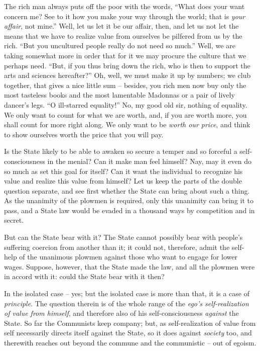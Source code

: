 The rich man always puts off the poor with the words, ``What does your want 
concern me? See to it how you make your way through the world; that is 
\textit{your affair}, not mine.'' Well, let us let it be our affair, then, 
and let us not let the means that we have to realize value from ourselves be 
pilfered from us by the rich. ``But you uncultured people really do not need 
so much.'' Well, we are taking somewhat more in order that for it we may 
procure the culture that we perhaps need. ``But, if you thus bring down the 
rich, who is then to support the arts and sciences hereafter?'' Oh, well, we 
must make it up by numbers; we club together, that gives a nice little sum -- 
besides, you rich men now buy only the most tasteless books and the most 
lamentable Madonnas or a pair of lively dancer's legs. ``O ill-starred 
equality!'' No, my good old sir, nothing of equality. We only want to count 
for what we are worth, and, if you are worth more, you shall count for more 
right along. We only want to be \textit{worth our price}, and think to show 
ourselves worth the price that you will pay.

Is the State likely to be able to awaken so secure a temper and so forceful a 
self-consciousness in the menial? Can it make man feel himself? Nay, may it 
even do so much as set this goal for itself? Can it want the individual to 
recognize his value and realize this value from himself? Let us keep the parts 
of the double question separate, and see first whether the State can bring 
about such a thing. As the unanimity of the plowmen is required, only this 
unanimity can bring it to pass, and a State law would be evaded in a thousand 
ways by competition and in secret.

But can the State bear with it? The State cannot possibly bear with people's 
suffering coercion from another than it; it could not, therefore, admit the 
self-help of the unanimous plowmen against those who want to engage for lower 
wages. Suppose, however, that the State made the law, and all the plowmen were 
in accord with it: could the State bear with it then?

In the isolated case -- yes; but the isolated case is more than that, it is a 
case of \textit{principle}. The question therein is of the whole range of the 
\textit{ego's self-realization of value from himself}, and therefore also of 
his self-consciousness \textit{against} the State. So far the Communists keep 
company; but, as self-realization of value from self necessarily directs 
itself against the State, so it does against \textit{society} too, and 
therewith reaches out beyond the commune and the communistic -- out of egoism.

